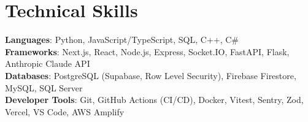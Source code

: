 \documentclass[letterpaper,11pt]{article}
\begin{document}
\section{Technical Skills}
 \begin{itemize}[leftmargin=0.15in, label={}]
    \small{\item{
     \textbf{Languages}{: Python, JavaScript/TypeScript, SQL, C++, C\#} \\
     \textbf{Frameworks}{: Next.js, React, Node.js, Express, Socket.IO, FastAPI, Flask, Anthropic Claude API} \\
     \textbf{Databases}{: PostgreSQL (Supabase, Row Level Security), Firebase Firestore, MySQL, SQL Server} \\
     \textbf{Developer Tools}{: Git, GitHub Actions (CI/CD), Docker, Vitest, Sentry, Zod, Vercel, VS Code, AWS Amplify}
    }}
 \end{itemize}


\end{document}
